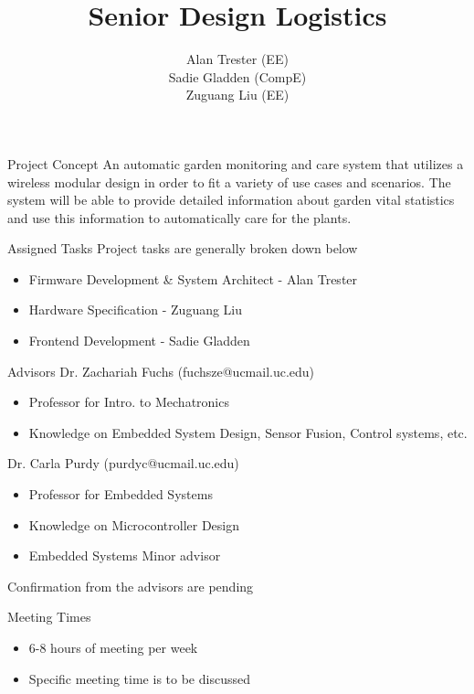 \documentclass{beamer}
\title{Senior Design Logistics}
\author[Alan Trester, Sadie Gladden, Zugaung Liu]{Alan Trester (EE) \\ Sadie Gladden (CompE) \\ Zuguang Liu (EE)}
\begin{document}
	
\begin{frame}[plain]
    \maketitle
\end{frame}
\begin{frame}{Project Concept}
	An automatic garden monitoring and care system that utilizes a wireless modular design in order to fit a variety of use cases and scenarios. The system will be able to provide detailed information about garden vital statistics and use this information to automatically care for the plants.
\end{frame}

\begin{frame}{Assigned Tasks}
  Project tasks are generally broken down below
  \begin{itemize}
    \item Firmware Development \& System Architect - Alan Trester
    \item Hardware Specification - Zuguang Liu
    \item Frontend Development - Sadie Gladden
  \end{itemize}
\end{frame}

\begin{frame}{Advisors}
	Dr. Zachariah Fuchs (fuchsze@ucmail.uc.edu)
	\begin{itemize}
		\item Professor for Intro. to Mechatronics
		\item Knowledge on Embedded System Design, Sensor Fusion, Control systems, etc.
	\end{itemize}
	Dr. Carla Purdy (purdyc@ucmail.uc.edu)
	\begin{itemize}
		\item Professor for Embedded Systems
		\item Knowledge on Microcontroller Design
		\item Embedded Systems Minor advisor
	\end{itemize}
	Confirmation from the advisors are pending
\end{frame}

\begin{frame}{Meeting Times}
	\begin{itemize}
		\item 6-8 hours of meeting per week
		\item Specific meeting time is to be discussed
	\end{itemize}
\end{frame}
\end{document}
